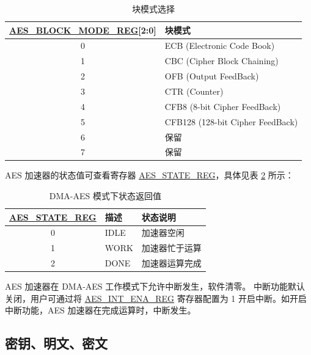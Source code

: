 \documentclass[main\_\_CN.tex]{subfiles}
\begin{document}
\begin{longtable}[c]{ | c | l | }
\caption{块模式选择}
\label{tab:aes-block-mode}
\\\hline
\rowcolor{lightgray}
\textbf{\hyperref[regdesc:AESBLOCKMODEREG]{AES\_BLOCK\_MODE\_REG}[2:0]}     & \textbf{块模式}\\
    \hline
    0                          & ECB (Electronic Code Book)    \\
    \hline
    1                          & CBC (Cipher Block Chaining)     \\
    \hline
    2                          & OFB (Output FeedBack)    \\
    \hline
    3                          & CTR (Counter)    \\
    \hline
    4                          & CFB8 (8-bit Cipher FeedBack)    \\
    \hline
    5                          & CFB128 (128-bit Cipher FeedBack) \\
    \hline
    6                          & 保留     \\
    \hline
    7                          & 保留     \\
    \hline
\end{longtable}

\newpage
AES 加速器的状态值可查看寄存器 \hyperref[regdesc:AESSTATEREG]{AES\_STATE\_REG}，具体见表 \ref{tab:aes-state-value-dma} 所示：

\begin{longtable}[c]{ | c | l | l | }
\caption{DMA-AES 模式下状态返回值}
\label{tab:aes-state-value-dma}
\\\hline
\rowcolor{lightgray}
\textbf{\hyperref[regdesc:AESSTATEREG]{AES\_STATE\_REG}} & \textbf{描述} &  \textbf{状态说明} \\ \hline

    0                   & IDLE      &   加速器空闲\\ \hline
    1                   & WORK      &   加速器忙于运算     \\ \hline
    2                   & DONE      &   加速器运算完成     \\ \hline
\end{longtable}

AES 加速器在 DMA-AES 工作模式下允许中断发生，软件清零。
中断功能默认关闭，用户可通过将 \hyperref[regdesc:AESINTENAREG]{AES\_INT\_ENA\_REG} 寄存器配置为 1 开启中断。如开启中断功能，AES 加速器在完成运算时，中断发生。

\subsection{密钥、明文、密文}
\end{document}
